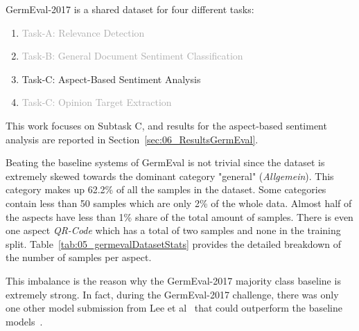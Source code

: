 GermEval-2017 is a shared dataset for four different tasks: 

\begin{enumerate}
    \item \textcolor{darkgray}{Task-A: Relevance Detection}
    \item \textcolor{darkgray}{Task-B: General Document Sentiment Classification}
    \item Task-C: Aspect-Based Sentiment Analysis
    \item \textcolor{darkgray}{Task-C: Opinion Target Extraction}
\end{enumerate}

This work focuses on Subtask C, and results for the aspect-based sentiment analysis are reported in Section~\ref{sec:06_ResultsGermEval}.
\medskip

Beating the baseline systems of GermEval is not trivial since the dataset is extremely skewed towards the dominant category "general" {(\textit{Allgemein})}. This category makes up 62.2\% of all the samples in the dataset. Some categories contain less than 50 samples which are only 2\% of the whole data. Almost half of the aspects have less than 1\% share of the total amount of samples. There is even one aspect \textit{QR-Code} which has a total of two samples and none in the training split. Table~\ref{tab:05_germevalDatasetStats} provides the detailed breakdown of the number of samples per aspect.

This imbalance is the reason why the GermEval-2017 majority class baseline is extremely strong. In fact, during the GermEval-2017 challenge, there was only one other model submission from Lee et al~\cite{Lee2017} that could outperform the baseline models~\cite{Wojatzki2017}.
\medskip


